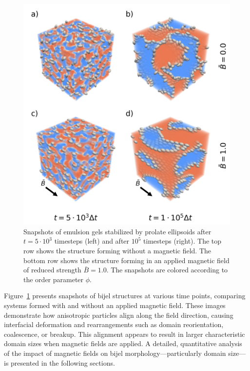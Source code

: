 \begin{figure}
    \centering
    \includegraphics[scale=0.6]{../figures/results/paper1/microstructure_viz.png}
    \caption{Snapshots of emulsion gels stabilized by prolate ellipsoids after $t=5\cdot10^3$ timesteps (left) and after $10^5$ timesteps (right). 
             The top row shows the structure forming without a magnetic field. The bottom row shows the structure forming in an applied magnetic 
             field of reduced strength $\bar{B}=1.0$. The snapshots are colored according to the order parameter $\phi$.}
    \label{fig:microstructure_viz}
\end{figure}

Figure~\ref{fig:microstructure_viz} presents snapshots of bijel structures at various time points, comparing systems formed with and without an applied 
magnetic field. These images demonstrate how anisotropic particles align along the field direction, causing interfacial deformation and rearrangements 
such as domain reorientation, coalescence, or breakup. This alignment appears to result in larger characteristic domain sizes when magnetic fields are 
applied. A detailed, quantitative analysis of the impact of magnetic fields on bijel morphology—particularly domain size—is presented in the following sections.
    
